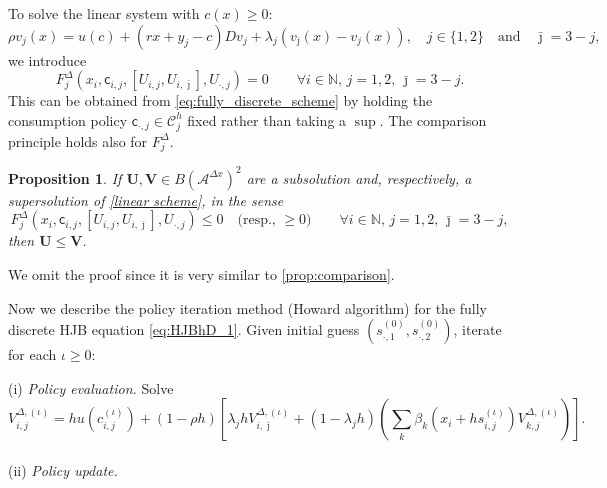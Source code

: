 \documentclass[11pt]{article}
\numberwithin{equation}{section}
\newtheorem{proposition}[theorem]{Proposition}
\theoremstyle{Claim}
\newcommand{\N}{\mathbb{N}}
\newcommand{\mA}{\mathcal A}
\newcommand{\mC}{\mathcal C}
\def\i{{(\iota)}}
\def\bV{{\mathbf{V}}}
\newcommand{\bU}{\mathbf{U}}
\newcommand{\beq}{\begin{equation}}
\newcommand{\eeq}{\end{equation}}
\theoremstyle{plain}
\newcommand{\D}{\Delta}
\newcommand{\Dx}{{\Delta x}}
\begin{document}
To solve the linear system with $c(x)\geq 0$:
\begin{equation}
		\rho v_j(x) = u(c) +(rx +y_j- c)Dv_j +\lambda_j(v_{\bar \jmath}(x)-v_j(x)),\quad j\in \{1,2\}\quad\text{and}\quad\bar \jmath=3-j,
	\end{equation}
we introduce 
\beq\label{linear scheme}
F^\D_j(x_i,\mathsf{c}_{i,j},[U_{i,j},U_{i,\bar{\jmath}}],U_{\cdot,j})=0 \qquad \forall i\in\N, \,j=1,2,\,\bar{\jmath}=3-j.
\eeq
This can be obtained from \cref{eq:fully_discrete_scheme} by holding the consumption policy $\mathsf{c}_{\cdot,j}\in \mC_j^h$ fixed rather than taking a $\sup$. The comparison principle holds also for $F^\D_j$. 
\begin{proposition}\label{linear comparison}
If $\bU, \bV\in B(\mA^\Dx)^2$ are a subsolution and, respectively, a supersolution of \eqref{linear scheme}, in the sense
\[	F^\D_j(x_i,\mathsf{c}_{i,j},[U_{i,j},U_{i,\bar{\jmath}}],U_{\cdot,j})\le 0 \quad\text{(resp., $\ge 0$)}\qquad \forall i\in\N, \,j=1,2,\,\bar{\jmath}=3-j,\]
then $\bU\le \bV$. 
\end{proposition}	
We omit the proof since it is very similar to \cref{prop:comparison}. \par
Now we describe the policy iteration method (Howard algorithm) for the fully discrete HJB equation \eqref{eq:HJBhD_1}. Given initial guess $(s_{\cdot,1}^{(0)},s_{\cdot,2}^{(0)})$, iterate for each $\iota \geq0$:

\noindent (i)  \textit{Policy evaluation.} Solve
\begin{equation}\label{eq:policy_ev}
     V_{i,j}^{\Delta, \i} = hu(c_{i,j}^{\i})+(1-\rho h)\left[\lambda_jhV_{i,\bar{\jmath}}^{\Delta,\i}+(1-\lambda_jh)\left(\sum_k\beta_k\left(x_i+hs^\i_{i,j}\right)V_{k,j}^{\Delta,\i}\right)\right].
\end{equation}\\
\noindent (ii) \textit{Policy update.} 
\end{document}
